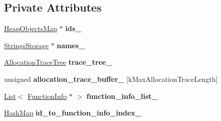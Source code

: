 \subsection*{Private Attributes}
\begin{DoxyCompactItemize}
\item 
\hyperlink{classv8_1_1internal_1_1_heap_objects_map}{Heap\+Objects\+Map} $\ast$ {\bfseries ids\+\_\+}\hypertarget{classv8_1_1internal_1_1_allocation_tracker_a09898522d9f5a3ddb83ac341da54c775}{}\label{classv8_1_1internal_1_1_allocation_tracker_a09898522d9f5a3ddb83ac341da54c775}

\item 
\hyperlink{classv8_1_1internal_1_1_strings_storage}{Strings\+Storage} $\ast$ {\bfseries names\+\_\+}\hypertarget{classv8_1_1internal_1_1_allocation_tracker_a4ff70d57e19c616436e54ffc1856ced7}{}\label{classv8_1_1internal_1_1_allocation_tracker_a4ff70d57e19c616436e54ffc1856ced7}

\item 
\hyperlink{classv8_1_1internal_1_1_allocation_trace_tree}{Allocation\+Trace\+Tree} {\bfseries trace\+\_\+tree\+\_\+}\hypertarget{classv8_1_1internal_1_1_allocation_tracker_a870259fdd00406cd018dd6f122b30962}{}\label{classv8_1_1internal_1_1_allocation_tracker_a870259fdd00406cd018dd6f122b30962}

\item 
unsigned {\bfseries allocation\+\_\+trace\+\_\+buffer\+\_\+} \mbox{[}k\+Max\+Allocation\+Trace\+Length\mbox{]}\hypertarget{classv8_1_1internal_1_1_allocation_tracker_a4f124d5e95ed5b432c35c208db680577}{}\label{classv8_1_1internal_1_1_allocation_tracker_a4f124d5e95ed5b432c35c208db680577}

\item 
\hyperlink{classv8_1_1internal_1_1_list}{List}$<$ \hyperlink{structv8_1_1internal_1_1_allocation_tracker_1_1_function_info}{Function\+Info} $\ast$ $>$ {\bfseries function\+\_\+info\+\_\+list\+\_\+}\hypertarget{classv8_1_1internal_1_1_allocation_tracker_ae5b86f333eccf1561c5f650bf50b23a9}{}\label{classv8_1_1internal_1_1_allocation_tracker_ae5b86f333eccf1561c5f650bf50b23a9}

\item 
\hyperlink{classv8_1_1internal_1_1_template_hash_map_impl}{Hash\+Map} {\bfseries id\+\_\+to\+\_\+function\+\_\+info\+\_\+index\+\_\+}\hypertarget{classv8_1_1internal_1_1_allocation_tracker_a462cfcfd917d60b928758f0bafd83792}{}\label{classv8_1_1internal_1_1_allocation_tracker_a462cfcfd917d60b928758f0bafd83792}


\end{DoxyCompactItemize}

